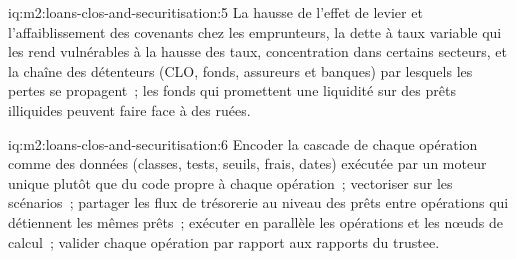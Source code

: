 \begin{solution}{iq:m2:loans-clos-and-securitisation:5}
La hausse de l'effet de levier et l'affaiblissement des covenants chez les emprunteurs, la dette à taux variable qui les rend
vulnérables à la hausse des taux, concentration dans certains secteurs, et la chaîne des
détenteurs (CLO, fonds, assureurs et banques) par lesquels les pertes se propagent~; les fonds qui
promettent une liquidité sur des prêts illiquides peuvent faire face à des ruées.
\end{solution}

\begin{solution}{iq:m2:loans-clos-and-securitisation:6}
Encoder la cascade de chaque opération comme des données (classes, tests, seuils, frais, dates) exécutée par un
moteur unique plutôt que du code propre à chaque opération~; vectoriser sur les scénarios~; partager les flux
de trésorerie au niveau des prêts entre opérations qui détiennent les mêmes prêts~; exécuter en parallèle les opérations et les
nœuds de calcul~; valider chaque opération par rapport aux rapports du trustee.
\end{solution}

